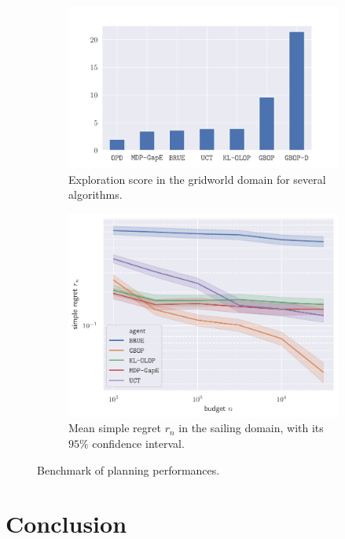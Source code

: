 \documentclass[runningheads]{llncs}
\begin{document}
\begin{figure}[ht]
	\centering
	\begin{subfigure}[b]{0.49\textwidth}
		\includegraphics[trim = {1.6cm 0.cm 2cm 1.5cm}, clip, width=\linewidth]{img/score.pdf}
		\caption{Exploration score in the gridworld domain for several algorithms.}
		\label{fig:exploration}
	\end{subfigure}
	\hfill%
	\begin{subfigure}[b]{0.49\textwidth}
		\includegraphics[trim = {0.2cm 0.2cm 0.7cm 0.5cm}, clip, width=\linewidth]{img/simple_regret.pdf}
		\caption{Mean simple regret $r_n$ in the sailing domain, with its $95\%$ confidence interval.}
		\label{fig:sailing}
	\end{subfigure}
	\caption{Benchmark of planning performances.}
\end{figure}

\section*{Conclusion}
\end{document}
